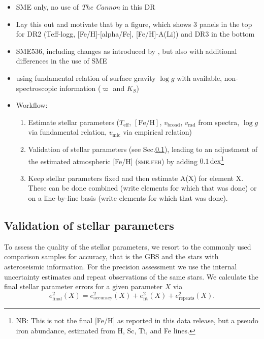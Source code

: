\documentclass[fleqn,usenatbib,useAMS]{mnras}
\newcommand{\teff}{$T_\mathrm{eff}$\xspace}
\newcommand{\logg}{$\log g$\xspace}
\newcommand{\feh}{$\mathrm{[Fe/H]}$\xspace}
\newcommand{\vmic}{$v_\mathrm{mic}$\xspace}
\newcommand{\vbroad}{$v_\mathrm{broad}$\xspace}
\newcommand{\vrad}{$v_\mathrm{rad}$\xspace}
\begin{document}
\begin{itemize}
\item SME only, no use of \textit{The Cannon} in this DR
\item Lay this out and motivate that by a figure, which shows 3 panels in the top for DR2 (Teff-logg, [Fe/H]-[alpha/Fe], [Fe/H]-A(Li)) and DR3 in the bottom
\item SME536, including changes as introduced by \citet{Piskunov2017}, but also with additional differences in the use of SME
\item using fundamental relation of surface gravity $\log g$ with available, non-spectroscopic information ($\varpi$ and $K_S$)
\item Workflow: 
\begin{enumerate}
	\item Estimate stellar parameters (\teff, \feh, \vbroad, \vrad from spectra, \logg via fundamental relation, \vmic via empirical relation)
	\item Validation of stellar parameters (see Sec.\ref{sec:validation_sp}), leading to an adjustment of the estimated atmospheric [Fe/H] (\textsc{sme.feh}) by adding $0.1\,\mathrm{dex}$\footnote{NB: This is not the final [Fe/H] as reported in this data release, but a pseudo iron abundance, estimated from H, Sc, Ti, and Fe lines.}
	\item Keep stellar parameters fixed and then estimate A(X) for element X. These can be done combined (write elements for which that was done) or on a line-by-line basis (write elements for which that was done).
\end{enumerate}
\end{itemize}

\subsection{Validation of stellar parameters} \label{sec:validation_sp}

To assess the quality of the stellar parameters, we resort to the commonly used comparison samples for accuracy, that is the GBS and the stars with asteroseismic information. For the precision assessment we use the internal uncertainty estimates and repeat observations of the same stars.  We calculate the final stellar parameter errors for a given parameter $X$ via 
\begin{equation}
e_\text{final}^2 (X) = e_\text{accuracy}^2(X) + e_\text{fit}^2(X) + e_\text{repeats}^2(X). \label{eq:final_error}
\end{equation}
\end{document}
